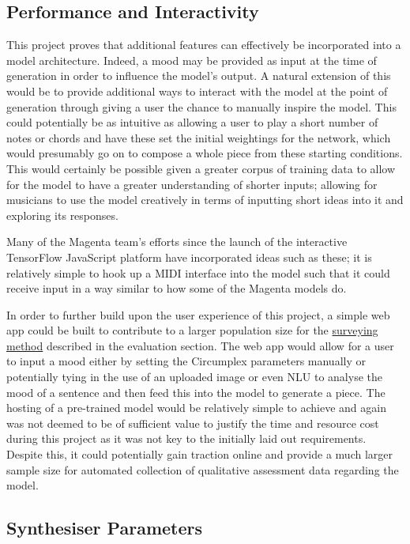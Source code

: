 \documentclass[12pt,]{article}
\begin{document}
\hypertarget{performance-and-interactivity}{%
\subsection{Performance and
Interactivity}\label{performance-and-interactivity}}

This project proves that additional features can effectively be
incorporated into a model architecture. Indeed, a mood may be provided
as input at the time of generation in order to influence the model's
output. A natural extension of this would be to provide additional ways
to interact with the model at the point of generation through giving a
user the chance to manually inspire the model. This could potentially be
as intuitive as allowing a user to play a short number of notes or
chords and have these set the initial weightings for the network, which
would presumably go on to compose a whole piece from these starting
conditions. This would certainly be possible given a greater corpus of
training data to allow for the model to have a greater understanding of
shorter inputs; allowing for musicians to use the model creatively in
terms of inputting short ideas into it and exploring its responses.

Many of the Magenta team's efforts since the launch of the interactive
TensorFlow JavaScript platform have incorporated ideas such as these; it
is relatively simple to hook up a MIDI interface into the model such
that it could receive input in a way similar to how some of the Magenta
models do.

In order to further build upon the user experience of this project, a
simple web app could be built to contribute to a larger population size
for the \protect\hyperlink{qualitativesurveryingmethod}{surveying
method} described in the evaluation section. The web app would allow for
a user to input a mood either by setting the Circumplex parameters
manually or potentially tying in the use of an uploaded image or even
NLU to analyse the mood of a sentence and then feed this into the model
to generate a piece. The hosting of a pre-trained model would be
relatively simple to achieve and again was not deemed to be of
sufficient value to justify the time and resource cost during this
project as it was not key to the initially laid out requirements.
Despite this, it could potentially gain traction online and provide a
much larger sample size for automated collection of qualitative
assessment data regarding the model.

\hypertarget{synthesiser-parameters}{%
\subsection{Synthesiser Parameters}\label{synthesiser-parameters}}
\end{document}
